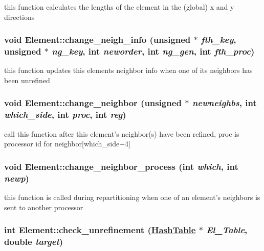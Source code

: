 this function calculates the lengths of the element in the (global) x and y directions 

\hypertarget{classElement_a100}{
\subsubsection[change\_\-neigh\_\-info]{\setlength{\rightskip}{0pt plus 5cm}void Element::change\_\-neigh\_\-info (unsigned $\ast$ {\em fth\_\-key}, unsigned $\ast$ {\em ng\_\-key}, int {\em neworder}, int {\em ng\_\-gen}, int {\em fth\_\-proc})}}
\label{classElement_a100}


this function updates this elements neighbor info when one of its neighbors has been unrefined 

\hypertarget{classElement_a35}{
\subsubsection[change\_\-neighbor]{\setlength{\rightskip}{0pt plus 5cm}void Element::change\_\-neighbor (unsigned $\ast$ {\em newneighbs}, int {\em which\_\-side}, int {\em proc}, int {\em reg})}}
\label{classElement_a35}


call this function after this element's neighbor(s) have been refined, proc is processor id for neighbor\mbox{[}which\_\-side+4\mbox{]} 

\hypertarget{classElement_a50}{
\subsubsection[change\_\-neighbor\_\-process]{\setlength{\rightskip}{0pt plus 5cm}void Element::change\_\-neighbor\_\-process (int {\em which}, int {\em newp})}}
\label{classElement_a50}


this function is called during repartitioning when one of an element's neighbors is sent to another processor 

\hypertarget{classElement_a99}{
\subsubsection[check\_\-unrefinement]{\setlength{\rightskip}{0pt plus 5cm}int Element::check\_\-unrefinement (\hyperlink{classHashTable}{Hash\-Table} $\ast$ {\em El\_\-Table}, double {\em target})}}
\label{classElement_a99}


